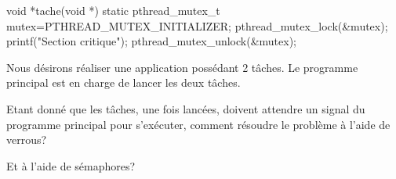 \begin{codeblock}
void *tache(void *) {
  static pthread_mutex_t mutex=PTHREAD_MUTEX_INITIALIZER;
  pthread_mutex_lock(&mutex);
  printf("Section critique\n");
  pthread_mutex_unlock(&mutex);
}
\end{codeblock}

\startexercice

Nous désirons réaliser une application possédant 2 tâches. Le programme principal est en charge de lancer les deux tâches.

Etant donné que les tâches, une fois lancées, doivent attendre un signal du programme principal pour s'exécuter, comment résoudre le problème à l'aide de verrous?

Et à l'aide de sémaphores?
